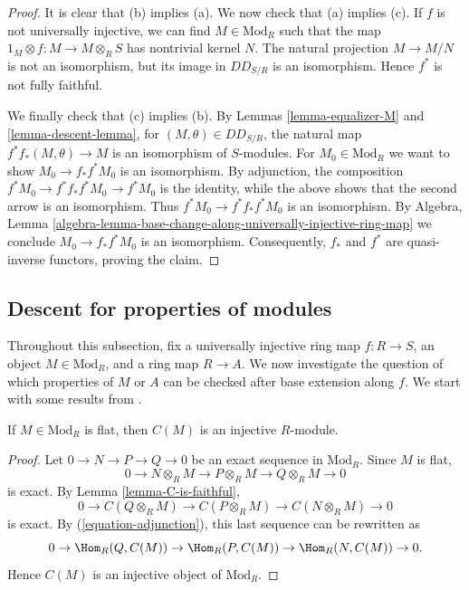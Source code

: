\begin{proof}
It is clear that (b) implies (a). We now check that (a) implies (c). If $f$ is 
not universally injective, we can find $M \in \text{Mod}_R$ such that the map
$1_M \otimes f: M \to M \otimes_R S$ has nontrivial kernel $N$.
The natural projection $M \to M/N$ is not an isomorphism, but its image in 
$DD_{S/R}$ is an isomorphism.
Hence $f^*$ is not fully faithful.

\medskip\noindent
We finally check that (c) implies (b). By Lemmas 
\ref{lemma-equalizer-M} and \ref{lemma-descent-lemma}, for
$(M, \theta) \in DD_{S/R}$,
the natural map $f^* f_*(M,\theta) \to M$ is an isomorphism of $S$-modules.
For $M_0 \in \text{Mod}_R$ we want to show $M_0 \to f_*f^*M_0$ is an
isomorphism. By adjunction, the composition
$f^*M_0 \to f^*f_*f^*M_0 \to f^*M_0$ is the identity, while the above
shows that the second arrow is an isomorphism. Thus
$f^*M_0 \to f^*f_*f^*M_0$ is an isomorphism. By Algebra, Lemma
\ref{algebra-lemma-base-change-along-universally-injective-ring-map}
we conclude $M_0 \to f_* f^* M_0$ is an isomorphism.
Consequently, $f_*$ and $f^*$ are  quasi-inverse functors, proving the claim.
\end{proof}

\subsection{Descent for properties of modules}
\label{subsection-descent-properties-modules}

\noindent
Throughout this subsection, fix a universally injective ring map $f : R \to S$,
an object $M \in \text{Mod}_R$, and a ring map $R \to A$. We now investigate
the question of which properties of $M$ or $A$ can be checked after base
extension along $f$. We start with some results from 
\cite{mesablishvili2}.

\begin{lemma}
\label{lemma-flat-to-injective}
If $M \in \text{Mod}_R$ is flat, then $C(M)$ is an injective $R$-module.
\end{lemma}

\begin{proof}
Let $0 \to N \to P \to Q \to 0$ be an exact sequence in $\text{Mod}_R$. Since 
$M$ is flat,
$$
0 \to N \otimes_R M \to P \otimes_R M \to Q \otimes_R M \to 0
$$
is exact.
By Lemma \ref{lemma-C-is-faithful},
$$
0 \to C(Q \otimes_R M) \to C(P \otimes_R M) \to C(N \otimes_R M) \to 0
$$
is exact. By (\ref{equation-adjunction}), this last sequence can be rewritten
as
$$
0 \to \Hom_R(Q, C(M)) \to \Hom_R(P, C(M)) \to \Hom_R(N, C(M)) \to 0.
$$
Hence $C(M)$ is an injective object of $\text{Mod}_R$.
\end{proof}

